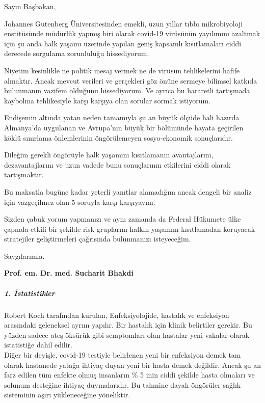 Sayın Başbakan,

Johannes Gutenberg Üniversitesinden emekli, uzun yıllar tıbbı
mikrobiyoloji enstitüsünde müdürlük yapmış biri olarak covid-19
virüsünün yayılımını azaltmak için şu anda halk yaşamı üzerinde yapılan
geniş kapsamlı kısıtlamaları ciddi derecede sorgulama zorunluluğu
hissediyorum.

Niyetim kesinlikle ne politik mesaj vermek ne de virüsün tehlikelerini
hafife almaktır. Ancak mevcut verileri ve gerçekleri göz önüne sermeye
bilimsel katkıda bulunmanın vazifem olduğunu hissediyorum. Ve ayrıca bu
hararetli tartışmada kaybolma tehlikesiyle karşı karşıya olan sorular
sormak istiyorum.

Endişemin altında yatan neden tamamıyla şu an büyük ölçüde hali hazırda
Almanya'da uygulanan ve Avrupa'nın büyük bir bölümünde hayata geçirilen
köklü sınırlama önlemlerinin öngörülemeyen sosyo-ekonomik sonuçlarıdır.

Dileğim gerekli öngörüyle halk yaşamını kısıtlamanın avantajlarını,
dezavantajlarını ve uzun vadede bunu sonuçlarının etkilerini ciddi
olarak tartışmaktır.

Bu maksatla bugüne kadar yeterli yanıtlar alamadığım ancak dengeli bir
analiz için vazgeçilmez olan 5 soruyla karşı karşıyayım.

Sizden çabuk yorum yapmanızı ve aynı zamanda da Federal Hükumete ülke
çapında etkili bir şekilde risk gruplarını halkın yaşamını kısıtlamadan
koruyacak stratejiler geliştirmeleri çağrısında bulunmanızı isteyeceğim.

Saygılarımla.

\textbf{Prof. em. Dr. med. Sucharit Bhakdi}

\hypertarget{1-istatistikler}{%
\subparagraph{\texorpdfstring{\textbf{1.
İstatistikler}}{1. İstatistikler}}\label{1-istatistikler}}

Robert Koch tarafından kurulan, Enfeksiyolojide, hastalık ve enfeksiyon
arasındaki geleneksel ayrım yapılır. Bir hastalık için klinik belirtiler
gerekir. Bu yüzden sadece ateş öksürük gibi semptomları olan hastalar
yeni vakalar olarak istatistiğe dahil edilir.\\
Diğer bir deyişle, covid-19 testiyle belirlenen yeni bir enfeksiyon
demek tam olarak hastanede yatağa ihtiyaç duyan yeni bir hasta demek
değildir. Ancak şu an farz edilen tüm enfekte olmuş insanların \% 5 inin
ciddi şekilde hasta olmaları ve solunum desteğine ihtiyaç duymalarıdır.
Bu tahmine dayalı öngörüler sağlık sisteminin aşırı yükleneceğine
yöneliktir.

